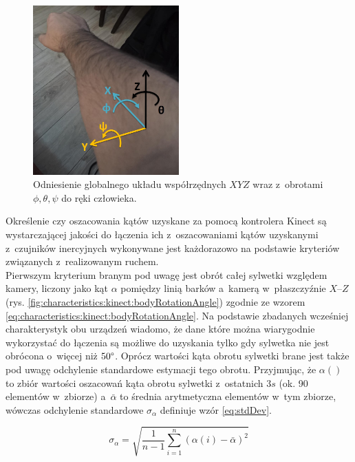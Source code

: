 \begin{figure}[!htb]
	\centering	
	\includegraphics[width=0.5\textwidth]{images/handAxes.jpg}	
	\caption{Odniesienie globalnego układu współrzędnych $XYZ$ wraz z~obrotami $\phi , \theta , \psi$ do ręki człowieka.}
	\label{fig:handAxes}
\end{figure}

Określenie czy oszacowania kątów uzyskane za pomocą kontrolera Kinect są wystarczającej jakości do łączenia ich z~oszacowaniami kątów uzyskanymi z~czujników inercyjnych wykonywane jest każdorazowo na podstawie kryteriów związanych z~realizowanym ruchem. \\
Pierwszym kryterium branym pod uwagę jest obrót całej sylwetki względem kamery, liczony jako kąt $\alpha$ pomiędzy linią barków a~kamerą w~płaszczyźnie $X$--$Z$ (rys. \ref{fig:characteristics:kinect:bodyRotationAngle}) zgodnie ze wzorem \ref{eq:characteristics:kinect:bodyRotationAngle}. Na podstawie zbadanych wcześniej charakterystyk obu urządzeń wiadomo, że dane które można wiarygodnie wykorzystać do łączenia są możliwe do uzyskania tylko gdy sylwetka nie jest obrócona o~więcej niż $50\degree$. Oprócz wartości kąta obrotu sylwetki brane jest także pod uwagę odchylenie standardowe estymacji tego obrotu. Przyjmując, że $\alpha()$
to zbiór wartości oszacowań kąta obrotu sylwetki z~ostatnich $3s$ (ok. 90 elementów w~zbiorze) a~$\bar{\alpha}$ to średnia arytmetyczna elementów w~tym zbiorze, wówczas odchylenie standardowe $\sigma_\alpha$ definiuje wzór \ref{eq:stdDev}.

\begin{equation}
	\sigma_\alpha = \sqrt{\frac{1}{n-1}\sum_{i=1}^{n}{(\alpha(i) - \bar{\alpha})^2}}
	\label{eq:stdDev}
\end{equation}


